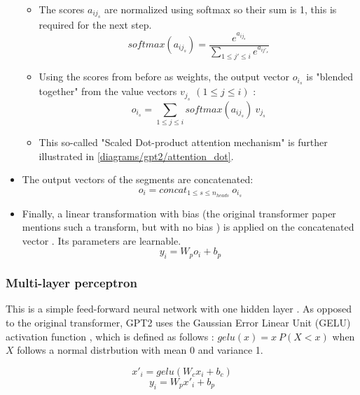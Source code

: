 \begin{itemize}
\begin{samepage}
\begin{itemize}
\item The scores $a_{ij_s}$ are normalized using softmax so their sum is 1, this is required for the next step.
   $$ softmax(a_{ij_s}) = \frac {e^{a_{ij_s}}} {\sum_{1 \leq j' \leq i} {e^{a_{ij'_s}}}} $$


\item Using the scores from before as weights, the output vector $o_{i_s}$ is "blended together" from the value vectors $v_{j_s}$ $(1 \leq j \leq i)$ \cite{alammar-gpt2}:
    $$o_{i_s} = \sum _{1 \leq j \leq i} softmax(a_{ij_s}) \ v_{j_s}$$

\item This so-called "Scaled Dot-product attention mechanism" is further illustrated in \cref{diagrams/gpt2/attention_dot}.

\end{itemize}
\end{samepage}


\item The output vectors of the segments are concatenated:
   $$o_i = concat _{1 \leq s \leq n_{heads}} \ o_{i_s}$$



\item Finally, a linear transformation with bias (the original transformer paper mentions such a transform, but with no bias ) is applied on the concatenated vector \cite{alammar-gpt2}. Its parameters are learnable.
   $$y_i = W_p o_i + b_p$$

\end{itemize}

\subsubsection{Multi-layer perceptron}


This is a simple feed-forward neural network with one hidden layer \cite[p. 5]{allyouneed}.
As opposed to the original transformer, GPT2 uses the Gaussian Error Linear Unit (GELU) activation function , which is defined as follows \cite{gelu}: $gelu(x) = x \ P(X<x)$ when $X$ follows a normal distrbution with mean 0 and variance 1.

$$x'_i = gelu(W_c x_i + b_c)$$
$$y_i = W_p x'_i + b_p$$

